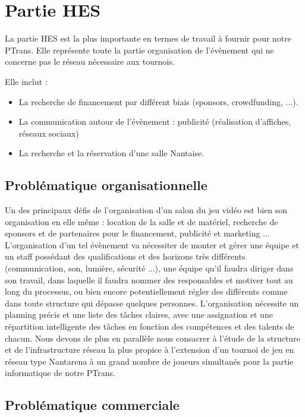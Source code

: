 \documentclass[french]{article}
\begin{document}
\newpage


\section{Partie HES}

La partie HES est la plus importante en termes de travail à fournir pour notre PTrans. Elle représente toute la partie organisation de l'évènement qui ne concerne pas le réseau nécessaire aux tournois.

Elle inclut :
\begin{itemize}
\item La recherche de financement par différent biais (sponsors, crowdfunding, ...).
\item La communication autour de l'évènement : publicité (réalisation d'affiches, réseaux sociaux)
\item La recherche et la réservation d'une salle Nantaise.
\end{itemize}

\subsection{Problématique organisationnelle}

Un des principaux défis de l'organisation d'un salon du jeu vidéo est bien son organisation en elle même : location de la salle et de matériel, recherche de sponsors et de partenaires pour le financement, publicité et marketing ...
L'organisation d'un tel évènement va nécessiter de monter et gérer une équipe et un staff possédant des qualifications et des horizons très différents (communication, son, lumière, sécurité ...), une équipe qu'il faudra diriger dans son travail, dans laquelle il faudra nommer des responsables et motiver tout au long du processus, ou bien encore potentiellement régler des différents comme dans toute structure qui dépasse quelques personnes.
L'organisation nécessite un planning précis et une liste des tâches claires, avec une assignation et une répartition intelligente des tâches en fonction des compétences et des talents de chacun.
Nous devons de plus en parallèle nous consacrer à l'étude de la structure et de l'infrastructure réseau la plus propice à l'extension d'un tournoi de jeu en réseau type Nantarena à un grand nombre de joueurs simultanés pour la partie informatique de notre PTrans.

\subsection{Problématique commerciale}
\end{document}
